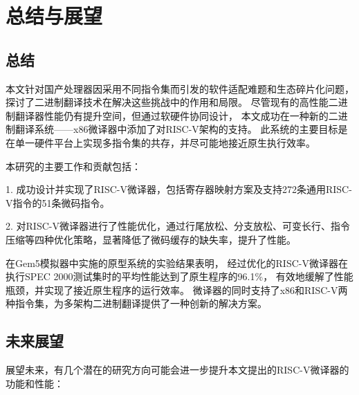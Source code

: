 \chapter{总结与展望}\label{chap:Conclusion}


\section{总结}
本文针对国产处理器因采用不同指令集而引发的软件适配难题和生态碎片化问题，探讨了二进制翻译技术在解决这些挑战中的作用和局限。
尽管现有的高性能二进制翻译器性能仍有提升空间，但通过软硬件协同设计，
本文成功在一种新的二进制翻译系统——x86微译器中添加了对RISC-V架构的支持。
此系统的主要目标是在单一硬件平台上实现多指令集的共存，并尽可能地接近原生执行效率。

本研究的主要工作和贡献包括：

1. 成功设计并实现了RISC-V微译器，包括寄存器映射方案及支持272条通用RISC-V指令的51条微码指令。

2. 对RISC-V微译器进行了性能优化，通过行尾放松、分支放松、可变长行、指令压缩等四种优化策略，显著降低了微码缓存的缺失率，提升了性能。

在Gem5模拟器中实施的原型系统的实验结果表明，
经过优化的RISC-V微译器在执行SPEC 2000测试集时的平均性能达到了原生程序的96.1\%，
有效地缓解了性能瓶颈，并实现了接近原生程序的运行效率。
微译器的同时支持了x86和RISC-V两种指令集，为多架构二进制翻译提供了一种创新的解决方案。

\section{未来展望}

展望未来，有几个潜在的研究方向可能会进一步提升本文提出的RISC-V微译器的功能和性能：

